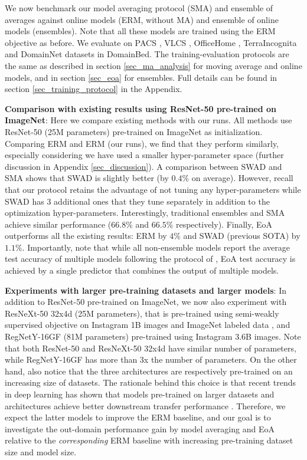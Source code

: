 \documentclass{article}
\begin{document}
We now benchmark our model averaging protocol (SMA) and ensemble of averages against online models (ERM, without MA) and ensemble of online models (ensembles). Note that all these models are trained using the ERM objective as before. We evaluate on PACS \cite{li2017deeper}, VLCS \cite{fang2013unbiased}, OfficeHome \cite{venkateswara2017deep}, TerraIncognita \cite{beery2018recognition} and DomainNet \cite{peng2019moment} datasets in DomainBed. The training-evaluation protocols are the same as described in section \ref{sec_ma_analysis} for moving average and online models, and in section \ref{sec_eoa} for ensembles. Full details can be found in section \ref{sec_training_protocol} in the Appendix.


\textbf{Comparison with existing results using ResNet-50 pre-trained on ImageNet}: Here we compare existing methods with our runs. All methods use ResNet-50 (25M parameters) \cite{he2016deep} pre-trained on ImageNet as initialization. Comparing ERM \cite{gulrajani2020search} and ERM (our runs), we find that they perform similarly, especially considering we have used a smaller hyper-parameter space (further discussion in Appendix \ref{sec_discussion}). A comparison between SWAD and SMA shows that SWAD is slightly better (by $0.4\%$ on average). However, recall that our protocol retains the advantage of not tuning any hyper-parameters while SWAD has 3 additional ones that they tune separately in addition to the optimization hyper-parameters. Interestingly, traditional ensembles and SMA achieve similar performance ($66.8\%$ and $66.5\%$ respectively). Finally, EoA outperforms all the existing results: ERM by $4\%$ and SWAD (previous SOTA) by $1.1\%$. Importantly, note that while all non-ensemble models report the average test accuracy of multiple models following the protocol of \cite{gulrajani2020search}, EoA test accuracy is achieved by a single predictor that combines the output of multiple models.

\textbf{Experiments with larger pre-training datasets and larger models}: In addition to ResNet-50 pre-trained on ImageNet, we now also experiment with ResNeXt-50 32x4d (25M parameters), that is pre-trained using semi-weakly supervised objective on Instagram 1B images and ImageNet labeled data \cite{yalniz2019billion}, and RegNetY-16GF (81M parameters) pre-trained using Instagram 3.6B images. Note that both ResNet-50 and ResNeXt-50 32x4d have similar number of parameters, while RegNetY-16GF has more than 3x the number of parameters. On the other hand, also notice that the three architectures are respectively pre-trained on an increasing size of datasets. The rationale behind this choice is that recent trends in deep learning has shown that models pre-trained on larger datasets and architectures achieve better downstream transfer performance \cite{dosovitskiy2020image,mahajan2018exploring,hendrycks2021many}. Therefore, we expect the latter models to improve the ERM baseline, and our goal is to investigate the out-domain performance gain by model averaging and EoA relative to the \textit{corresponding} ERM baseline with increasing pre-training dataset size and model size. 
\end{document}
